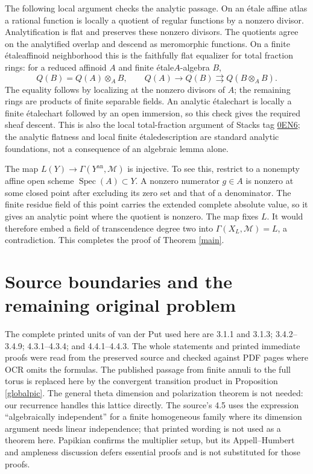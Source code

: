 \documentclass[11pt]{article}
\theoremstyle{remark}\newtheorem{remark}[theorem]{Remark}
\newcommand{\an}{\mathrm{an}}
\newcommand{\M}{\mathcal M}
\newcommand{\Etale}{\'etale}
\begin{document}
The following local argument checks the analytic passage. On an \Etale
affine atlas a rational
function is locally a quotient of regular functions by a nonzero
divisor. Analytification is flat and preserves these nonzero divisors.
The quotients agree on the analytified overlap and descend as
meromorphic functions. On a finite \Etale affinoid neighborhood this
is the faithfully flat equalizer for total fraction rings: for a
reduced affinoid $A$ and finite \Etale $A$-algebra $B$,
\[
 Q(B)=Q(A)\otimes_A B,\qquad
 Q(A)\longrightarrow Q(B)\rightrightarrows Q(B\otimes_A B).
\]
The equality follows by localizing at the nonzero divisors of $A$;
the remaining rings are products of finite separable fields. An
analytic \Etale chart is locally a finite \Etale chart followed by
an open immersion, so this check gives the required sheaf descent.
This is also the local total-fraction argument of Stacks tag
\href{https://stacks.math.columbia.edu/tag/0EN6}{0EN6}; the analytic
flatness and local finite \Etale description are standard analytic
foundations, not a consequence of an algebraic lemma alone.

The map $L(Y)\to\Gamma(Y^{\an},\M)$ is injective. To see this, restrict
to a nonempty affine open scheme $\operatorname{Spec}(A)\subset Y$.
A nonzero numerator $g\in A$ is nonzero at some closed point after
excluding its zero set and that of a denominator. The finite residue
field of this point carries the extended complete absolute value,
so it gives an analytic point where the quotient is nonzero.
The map fixes $L$. It would therefore embed a field of transcendence
degree two into $\Gamma(X_L,\M)=L$, a contradiction.
This completes the proof of Theorem \ref{main}.

\section{Source boundaries and the remaining original problem}
The complete printed units of van der Put used here are 3.1.1 and
3.1.3; 3.4.2--3.4.9; 4.3.1--4.3.4; and 4.4.1--4.4.3.
The whole statements and printed immediate proofs were read from the
preserved source and checked against PDF pages where OCR omits the
formulas. The published passage from finite annuli to the full torus
is replaced here by the convergent transition product in Proposition
\ref{globalpic}. The general theta dimension and polarization theorem
is not needed: our recurrence handles this lattice directly.
The source's 4.5 uses the expression ``algebraically independent'' for
a finite homogeneous family where its dimension argument needs linear
independence; that printed wording is not used as a theorem here.
Papikian \cite[4.2]{Papikian} confirms the multiplier setup, but its
Appell--Humbert and ampleness discussion defers essential proofs and
is not substituted for those proofs.
\end{document}
